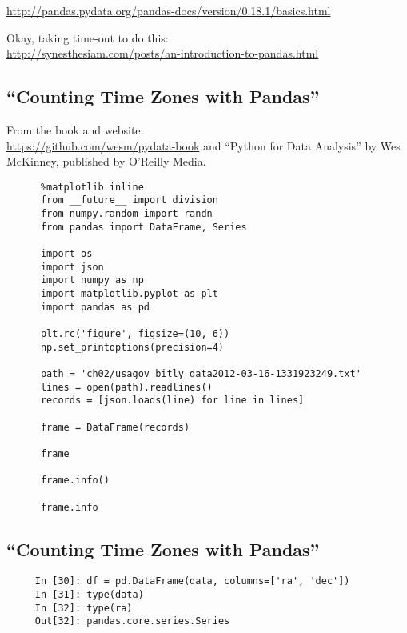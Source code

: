 \documentclass[11pt,a4paper]{article}
\begin{document}
    
    \smallskip
    \smallskip
    \noindent 
    \href{http://pandas.pydata.org/pandas-docs/version/0.18.1/basics.html}{http://pandas.pydata.org/pandas-docs/version/0.18.1/basics.html}
    
    \smallskip
    \smallskip
    \noindent 
    Okay, taking time-out to do this:\\
    \href{http://synesthesiam.com/posts/an-introduction-to-pandas.html}{http://synesthesiam.com/posts/an-introduction-to-pandas.html}
    
    

    \subsection{``Counting Time Zones with Pandas''}
    From the book and website:\\
    \href{https://github.com/wesm/pydata-book}{https://github.com/wesm/pydata-book}
    and ``Python for Data Analysis'' by Wes McKinney, published by O'Reilly Media. 

    \begin{lstlisting}
      %matplotlib inline
      from __future__ import division
      from numpy.random import randn
      from pandas import DataFrame, Series
      
      import os
      import json
      import numpy as np
      import matplotlib.pyplot as plt
      import pandas as pd
      
      plt.rc('figure', figsize=(10, 6))
      np.set_printoptions(precision=4)
      
      path = 'ch02/usagov_bitly_data2012-03-16-1331923249.txt'
      lines = open(path).readlines()
      records = [json.loads(line) for line in lines]

      frame = DataFrame(records)

      frame

      frame.info()

      frame.info

    \end{lstlisting}


    \subsection{``Counting Time Zones with Pandas''}
    \begin{lstlisting}
     In [30]: df = pd.DataFrame(data, columns=['ra', 'dec']) 
     In [31]: type(data)
     In [32]: type(ra)
     Out[32]: pandas.core.series.Series
    \end{lstlisting}
\end{document}
